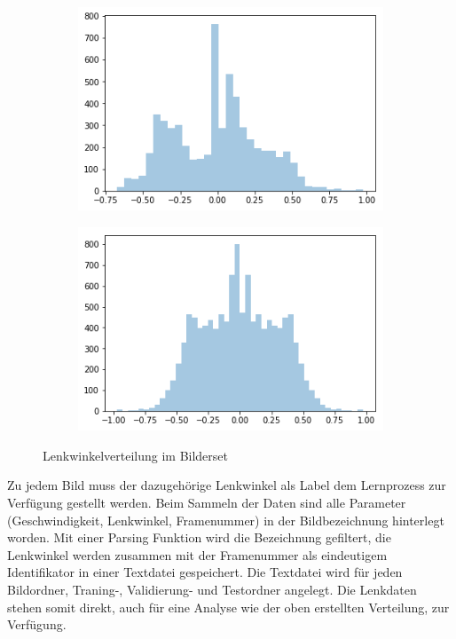 \begin{figure}[h]
	\centering
	\begin{subfigure}{.5\textwidth}
	\centering
		  \includegraphics[width=1\linewidth]{figures/steeringAngleDistribution.png}
	 	  \caption{}
		  \label{fig:anglesa}
	\end{subfigure}%
	\begin{subfigure}{.5\textwidth}
	\centering
		  \includegraphics[width=1\linewidth]{figures/steeringAngleDistributionFlipped.png}
	 	  \caption{}
		  \label{fig:anglesb}
	\end{subfigure}%
	\caption{Lenkwinkelverteilung im Bilderset}
	\label{fig:steuerungswinkel}
\end{figure}%

Zu jedem Bild muss der dazugehörige Lenkwinkel als Label dem Lernprozess zur Verfügung gestellt werden. Beim Sammeln der Daten sind alle Parameter (Geschwindigkeit, Lenkwinkel, Framenummer) in der Bildbezeichnung hinterlegt worden. Mit einer Parsing Funktion wird die Bezeichnung gefiltert, die Lenkwinkel werden zusammen mit der Framenummer als eindeutigem Identifikator in einer Textdatei gespeichert. Die Textdatei wird für jeden Bildordner, Traning-, Validierung- und Testordner angelegt. Die Lenkdaten stehen somit direkt, auch für eine Analyse wie der oben erstellten Verteilung, zur Verfügung.


